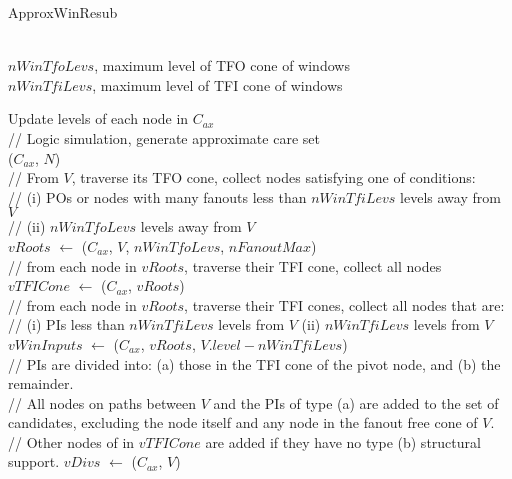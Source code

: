 \documentclass{rpt}
\begin{document}
\begin{algorithm}[H]
    \caption{\small ApproxWinResub}
    \begin{small}
        \\
        $nWinTfoLevs$, maximum level of TFO cone of windows\\
        $nWinTfiLevs$, maximum level of TFI cone of windows\\

        \vspace{1em}
        Update levels of each node in $C_{ax}$\\

        \vspace{1em}
        // Logic simulation, generate approximate care set\\
        \Simulate($C_{ax}$, $N$)\\

        \vspace{1em}
        // From $V$, traverse its TFO cone, collect nodes satisfying one of conditions:\\
        // (i) POs or nodes with many fanouts less than $nWinTfiLevs$ levels away from $V$\\
        // (ii) $nWinTfoLevs$ levels away from $V$\\
        $vRoots$ $\leftarrow$ \FindRoots($C_{ax}$, $V$, $nWinTfoLevs$, $nFanoutMax$)\\

        \vspace{1em}
        // from each node in $vRoots$, traverse their TFI cone, collect all nodes\\
        $vTFICone$ $\leftarrow$ \FindTFICone($C_{ax}$, $vRoots$)\\

        \vspace{1em}
        // from each node in $vRoots$, traverse their TFI cones, collect all nodes that are:\\
        // (i) PIs less than $nWinTfiLevs$ levels from $V$ (ii) $nWinTfiLevs$ levels from $V$\\
        $vWinInputs$ $\leftarrow$ \FindWinInputs($C_{ax}$, $vRoots$, $V.level - nWinTfiLevs$)\\

        \vspace{1em}
        // PIs are divided into: (a) those in the TFI cone of the pivot node, and (b) the remainder.\\
        // All nodes on paths between $V$ and the PIs of type (a) are added to the set of candidates,
        excluding the node itself and any node in the fanout free cone of $V$.\\
        // Other nodes of in $vTFICone$ are added if they have no type (b) structural support.
        $vDivs$ $\leftarrow$ \FindDivisors($C_{ax}$, $V$)\\


\end{small}
\end{algorithm}
\end{document}
